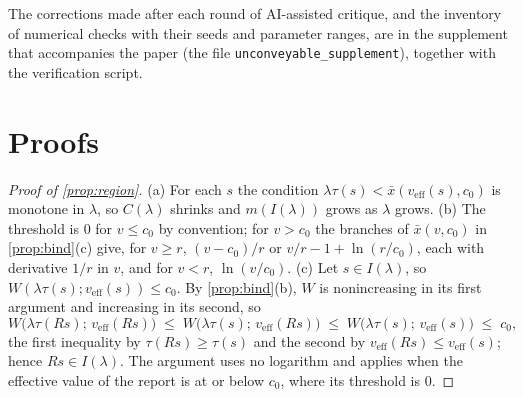 The corrections made after each round of AI-assisted critique, and the inventory of numerical checks with their seeds and parameter ranges, are in the supplement that accompanies the paper (the file \texttt{unconveyable\_supplement}), together with the verification script.

\section{Proofs}\label{app:proofs}

\begin{proof}[Proof of \autoref{prop:region}]
(a) For each $s$ the condition $\lambda\tau(s) < \bar{x}(v_{\mathrm{eff}}(s), c_0)$ is monotone in $\lambda$, so $C(\lambda)$ shrinks and $m(I(\lambda))$ grows as $\lambda$ grows. (b) The threshold is $0$ for $v \le c_0$ by convention; for $v > c_0$ the branches of $\bar{x}(v, c_0)$ in \autoref{prop:bind}(c) give, for $v \ge r$, $(v - c_0)/r$ or $v/r - 1 + \ln(r/c_0)$, each with derivative $1/r$ in $v$, and for $v < r$, $\ln(v/c_0)$. (c) Let $s \in I(\lambda)$, so $W(\lambda\tau(s); v_{\mathrm{eff}}(s)) \le c_0$. By \autoref{prop:bind}(b), $W$ is nonincreasing in its first argument and increasing in its second, so
\[
W\big(\lambda\tau(Rs);\, v_{\mathrm{eff}}(Rs)\big) \;\le\; W\big(\lambda\tau(s);\, v_{\mathrm{eff}}(Rs)\big) \;\le\; W\big(\lambda\tau(s);\, v_{\mathrm{eff}}(s)\big) \;\le\; c_0,
\]
the first inequality by $\tau(Rs) \ge \tau(s)$ and the second by $v_{\mathrm{eff}}(Rs) \le v_{\mathrm{eff}}(s)$; hence $Rs \in I(\lambda)$. The argument uses no logarithm and applies when the effective value of the report is at or below $c_0$, where its threshold is $0$.
\end{proof}

